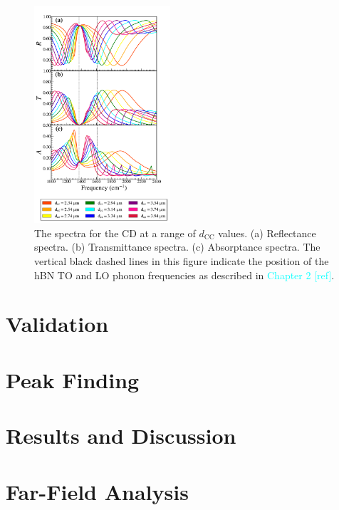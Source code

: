 \documentclass[preprint,
amsmath,amssymb,
aip,
jap,
floatfix,]{revtex4-2}
\begin{document}
			\begin{figure}[!htb]
			  \centering\includegraphics[width=0.45\textwidth]{Figures/FullRTA1000_2400.png}
			  \caption{The spectra for the CD at a range of $d_\mathrm{CC}$ values. (a) Reflectance spectra. (b) Transmittance spectra. (c) Absorptance spectra.  The vertical black dashed lines in this figure indicate the position of the hBN TO and LO phonon frequencies as described in \textcolor{cyan}{Chapter 2 [ref]}.}
			  \label{fig:3.4}
			\end{figure}


		\section{Validation}
		\label{sec:Val}

		\section{Peak Finding}
		\label{sec:PF}		

		\section{Results and Discussion}
			\label{sec:R&D}
			
		\section{Far-Field Analysis}
		\label{sec:FFA}
\end{document}
